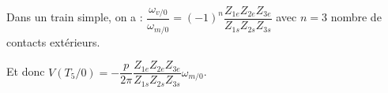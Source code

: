 \begin{corrigebox}
Dans un train simple, on a : $\dfrac{\omega_{v/0}}{\omega_{m/0}} = (-1)^n \dfrac{Z_{1e}Z_{2e}Z_{3e}}{Z_{1s}Z_{2s}Z_{3s}}$ avec $n=3$ nombre de contacts extérieurs.

Et donc $V(T_5/0) =-\dfrac{p}{2\pi} \dfrac{Z_{1e}Z_{2e}Z_{3e}}{Z_{1s}Z_{2s}Z_{3s}} \omega_{m/0}$.
\end{corrigebox}
